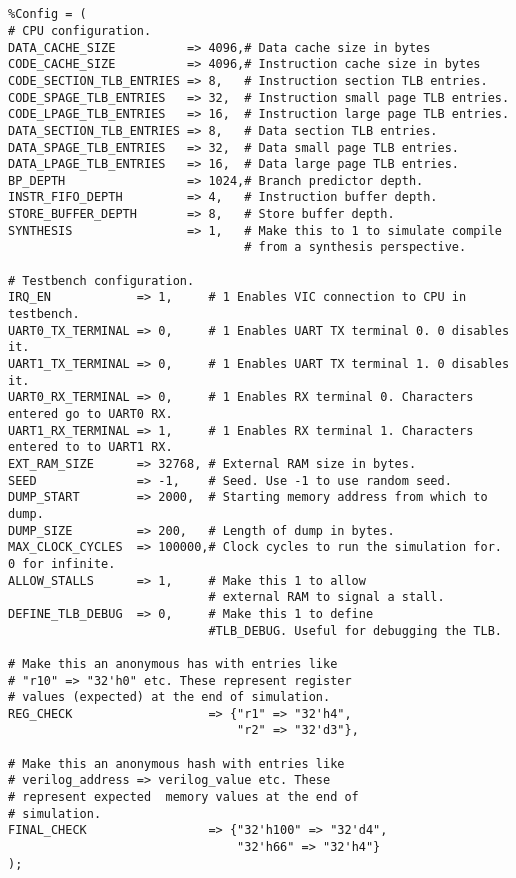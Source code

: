 \documentclass[10pt]{article}
\begin{document}
\\
\begin{lstlisting}[frame=none] % Perl code block start.

%Config = ( 
# CPU configuration.
DATA_CACHE_SIZE          => 4096,# Data cache size in bytes
CODE_CACHE_SIZE          => 4096,# Instruction cache size in bytes
CODE_SECTION_TLB_ENTRIES => 8,   # Instruction section TLB entries.
CODE_SPAGE_TLB_ENTRIES   => 32,  # Instruction small page TLB entries.
CODE_LPAGE_TLB_ENTRIES   => 16,  # Instruction large page TLB entries.
DATA_SECTION_TLB_ENTRIES => 8,   # Data section TLB entries.
DATA_SPAGE_TLB_ENTRIES   => 32,  # Data small page TLB entries.
DATA_LPAGE_TLB_ENTRIES   => 16,  # Data large page TLB entries.
BP_DEPTH                 => 1024,# Branch predictor depth.
INSTR_FIFO_DEPTH         => 4,   # Instruction buffer depth.
STORE_BUFFER_DEPTH       => 8,   # Store buffer depth.
SYNTHESIS                => 1,   # Make this to 1 to simulate compile 
                                 # from a synthesis perspective.

# Testbench configuration.
IRQ_EN            => 1,     # 1 Enables VIC connection to CPU in testbench.
UART0_TX_TERMINAL => 0,     # 1 Enables UART TX terminal 0. 0 disables it.
UART1_TX_TERMINAL => 0,     # 1 Enables UART TX terminal 1. 0 disables it.
UART0_RX_TERMINAL => 0,     # 1 Enables RX terminal 0. Characters entered go to UART0 RX.
UART1_RX_TERMINAL => 1,     # 1 Enables RX terminal 1. Characters entered to to UART1 RX. 
EXT_RAM_SIZE      => 32768, # External RAM size in bytes.
SEED              => -1,    # Seed. Use -1 to use random seed.
DUMP_START        => 2000,  # Starting memory address from which to dump.
DUMP_SIZE         => 200,   # Length of dump in bytes.
MAX_CLOCK_CYCLES  => 100000,# Clock cycles to run the simulation for. 0 for infinite.
ALLOW_STALLS      => 1,     # Make this 1 to allow 
                            # external RAM to signal a stall.
DEFINE_TLB_DEBUG  => 0,     # Make this 1 to define 
                            #TLB_DEBUG. Useful for debugging the TLB.

# Make this an anonymous has with entries like 
# "r10" => "32'h0" etc. These represent register 
# values (expected) at the end of simulation.
REG_CHECK                   => {"r1" => "32'h4", 
                                "r2" => "32'd3"},      

# Make this an anonymous hash with entries like 
# verilog_address => verilog_value etc. These 
# represent expected  memory values at the end of 
# simulation.
FINAL_CHECK                 => {"32'h100" => "32'd4", 
                                "32'h66" => "32'h4"}       
);

\end{lstlisting}
\end{document}
